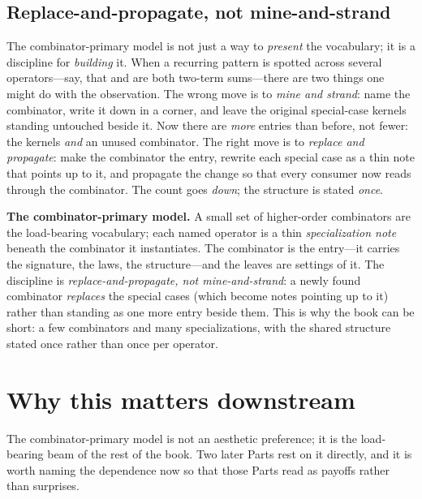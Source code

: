 \subsection{Replace-and-propagate, not mine-and-strand}

The combinator-primary model is not just a way to \emph{present} the vocabulary;
it is a discipline for \emph{building} it. When a recurring pattern is spotted
across several operators---say, that  and  are both
two-term sums---there are two things one might do with the observation. The wrong
move is to \emph{mine and strand}: name the combinator, write it down in a corner,
and leave the original special-case kernels standing untouched beside it. Now there
are \emph{more} entries than before, not fewer: the kernels \emph{and} an unused
combinator. The right move is to \emph{replace and propagate}: make the combinator
the entry, rewrite each special case as a thin note that points up to it, and
propagate the change so that every consumer now reads through the combinator. The
count goes \emph{down}; the structure is stated \emph{once}.

\begin{keyidea}
\textbf{The combinator-primary model.} A small set of higher-order combinators are
the load-bearing vocabulary; each named operator is a thin \emph{specialization
note} beneath the combinator it instantiates. The combinator is the entry---it
carries the signature, the laws, the structure---and the leaves are settings of it.
The discipline is \emph{replace-and-propagate, not mine-and-strand}: a newly found
combinator \emph{replaces} the special cases (which become notes pointing up to it)
rather than standing as one more entry beside them. This is why the book can be
short: a few combinators and many specializations, with the shared structure stated
once rather than once per operator.
\end{keyidea}

\section{Why this matters downstream}
\label{sec:downstream}

The combinator-primary model is not an aesthetic preference; it is the load-bearing
beam of the rest of the book. Two later Parts rest on it directly, and it is worth
naming the dependence now so that those Parts read as payoffs rather than
surprises.

